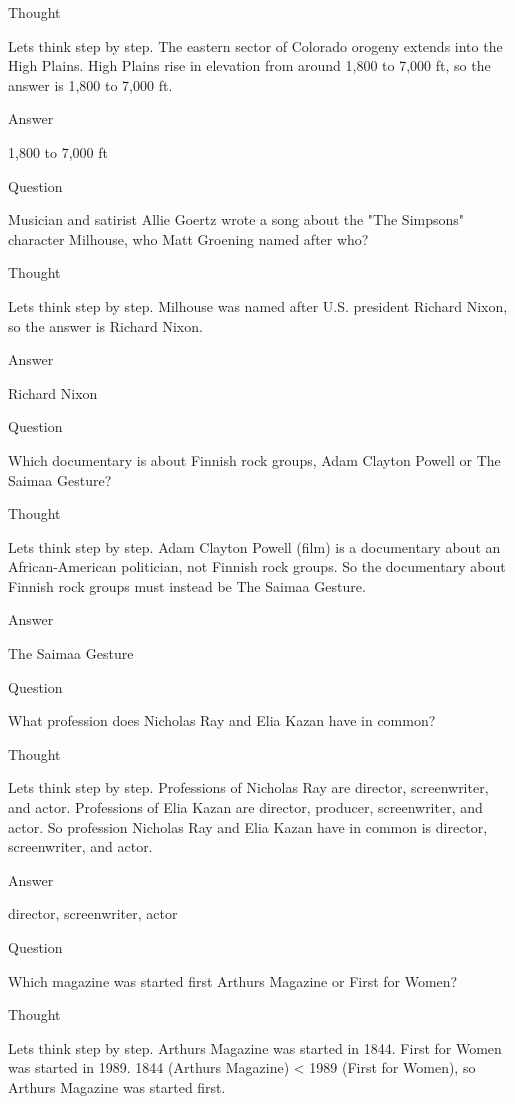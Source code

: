 \documentclass[
]{article}
\begin{document}
Thought

Let\textquotesingle s think step by step. The eastern sector of Colorado
orogeny extends into the High Plains. High Plains rise in elevation from
around 1,800 to 7,000 ft, so the answer is 1,800 to 7,000 ft.

Answer

1,800 to 7,000 ft

Question

Musician and satirist Allie Goertz wrote a song about the "The Simpsons"
character Milhouse, who Matt Groening named after who?

Thought

Let\textquotesingle s think step by step. Milhouse was named after U.S.
president Richard Nixon, so the answer is Richard Nixon.

Answer

Richard Nixon

Question

Which documentary is about Finnish rock groups, Adam Clayton Powell or
The Saimaa Gesture?

Thought

Let\textquotesingle s think step by step. Adam Clayton Powell (film) is
a documentary about an African-American politician, not Finnish rock
groups. So the documentary about Finnish rock groups must instead be The
Saimaa Gesture.

Answer

The Saimaa Gesture

Question

What profession does Nicholas Ray and Elia Kazan have in common?

Thought

Let\textquotesingle s think step by step. Professions of Nicholas Ray
are director, screenwriter, and actor. Professions of Elia Kazan are
director, producer, screenwriter, and actor. So profession Nicholas Ray
and Elia Kazan have in common is director, screenwriter, and actor.

Answer

director, screenwriter, actor

Question

Which magazine was started first Arthur\textquotesingle s Magazine or
First for Women?

Thought

Let\textquotesingle s think step by step. Arthur\textquotesingle s
Magazine was started in 1844. First for Women was started in 1989. 1844
(Arthur\textquotesingle s Magazine) \textless{} 1989 (First for Women),
so Arthur\textquotesingle s Magazine was started first.
\end{document}
